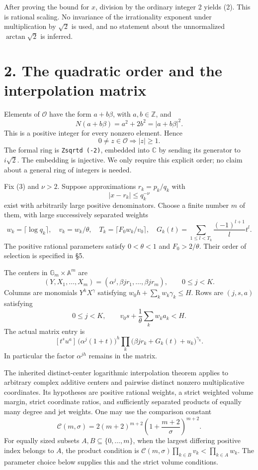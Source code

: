 \documentclass[11pt]{article}
\begin{document}
After proving the bound for \(x\), division by the ordinary integer 2
yields (2). This is rational scaling. No invariance of the irrationality
exponent under multiplication by \(\sqrt2\) is used, and no statement
about the unnormalized \(\arctan\sqrt2\) is inferred.

\section{2. The quadratic order and the interpolation
matrix}\label{the-quadratic-order-and-the-interpolation-matrix}

Elements of \(\mathcal O\) have the form \(a+b\beta\), with
\(a,b\in\mathbb Z\), and \[
N(a+b\beta)=a^2+2b^2=|a+b\beta|^2.
\tag{5}
\] This is a positive integer for every nonzero element. Hence \[
0\ne z\in\mathcal O\Longrightarrow |z|\ge1.
\tag{6}
\] The formal ring is \texttt{Zsqrtd\ (-2)}, embedded into \(\mathbb C\)
by sending its generator to \(i\sqrt2\). The embedding is injective. We
only require this explicit order; no claim about a general ring of
integers is needed.

Fix (3) and \(\nu>2\). Suppose approximations \(r_k=p_k/q_k\) with \[
|x-r_k|\le q_k^{-\nu}
\tag{7}
\] exist with arbitrarily large positive denominators. Choose a finite
number \(m\) of them, with large successively separated weights \[
w_k=\lceil\log q_k\rceil,\quad v_k=w_k/\theta,
\quad T_k=\lceil F_0w_k/v_0\rceil,
\quad G_k(t)=\sum_{1\le l<T_k}\frac{(-1)^{l+1}}l t^l.
\] The positive rational parameters satisfy \(0<\theta<1\) and
\(F_0>2/\theta\). Their order of selection is specified in §5.

The centers in \(\mathbb G_m\times\mathbb A^m\) are \[
(Y,X_1,\ldots,X_m)=(\alpha^j,\beta jr_1,\ldots,\beta jr_m),
\qquad 0\le j<K.
\] Columns are monomials \(Y^hX^\gamma\) satisfying
\(w_0h+\sum_kw_k\gamma_k\le H\). Rows are \((j,s,a)\) satisfying \[
0\le j<K,\qquad v_0s+\frac1\theta\sum_kw_ka_k<H.
\] The actual matrix entry is \[
[t^su^a]\,\bigl(\alpha^j(1+t)\bigr)^h
\prod_k\bigl(\beta jr_k+G_k(t)+u_k\bigr)^{\gamma_k}.
\tag{8}
\] In particular the factor \(\alpha^{jh}\) remains in the matrix.

The inherited distinct-center logarithmic interpolation theorem applies
to arbitrary complex additive centers and pairwise distinct nonzero
multiplicative coordinates. Its hypotheses are positive rational
weights, a strict weighted volume margin, strict coordinate ratios, and
sufficiently separated products of equally many degree and jet weights.
One may use the comparison constant \[
\mathcal C(m,\sigma)=2(m+2)^{m+2}
\left(1+\frac{m+2}{\sigma}\right)^{m+2}.
\] For equally sized subsets \(A,B\subseteq\{0,\ldots,m\}\), when the
largest differing positive index belongs to \(A\), the product condition
is \(\mathcal C(m,\sigma)\prod_{k\in B}v_k<\prod_{k\in A}w_k\). The
parameter choice below supplies this and the strict volume conditions.
\end{document}
